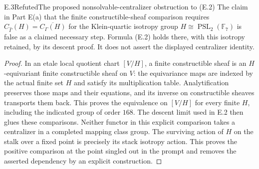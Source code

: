 \begin{result}{E.3}{Refuted}{The proposed nonsolvable-centralizer obstruction to (E.2)}
The claim in Part E(a) that the finite constructible-sheaf comparison
requires
$C_{\widehat\Gamma}(H)=\overline{C_\Gamma(H)}$ for the Klein-quartic
isotropy group $H\cong\operatorname{PSL}_2(\mathbb F_7)$ is false as
a claimed necessary step.  Formula (E.2) holds there, with this isotropy
retained, by its descent proof.  It does not assert the displayed
centralizer identity.
\end{result}
\begin{proof}
In an etale local quotient chart $[V/H]$, a finite constructible sheaf
is an $H$-equivariant finite constructible sheaf on $V$: the equivariance
maps are indexed by the actual finite set $H$ and satisfy its
multiplication table.  Analytification preserves those maps and their
equations, and its inverse on constructible sheaves transports them
back.  This proves the equivalence on $[V/H]$ for every finite $H$,
including the indicated group of order $168$.  The descent limit
used in E.2 then glues these comparisons.  Neither functor in this
explicit comparison takes a centralizer in a completed mapping class
group.  The surviving action of $H$ on the stalk over a fixed point
is precisely its stack isotropy action.  This proves the positive
comparison at the point singled out in the prompt and removes the
asserted dependency by an explicit construction.
\end{proof}

